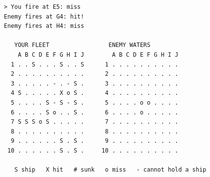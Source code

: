 \begin{lstlisting}[language={}, basicstyle=\ttfamily\footnotesize,
                   caption={Extrait d'une partie dans un terminal
                            (\code{battleship-cli play -{}-seed 7 -{}-level hard}) : l'ordinateur
                            touche en G4, le modèle exclut les diagonales, puis il
                            cherche la suite du bateau.},
                   label={lst-terminal}]
> You fire at E5: miss
Enemy fires at G4: hit!
Enemy fires at H4: miss

   YOUR FLEET                 ENEMY WATERS
    A B C D E F G H I J        A B C D E F G H I J
  1 . . S . . . S . . S      1 . . . . . . . . . .
  2 . . . . . . . . . .      2 . . . . . . . . . .
  3 . . . . . - . - S .      3 . . . . . . . . . .
  4 S . . . . . X o S .      4 . . . . . . . . . .
  5 . . . . S - S - S .      5 . . . . o o . . . .
  6 . . . . S o . . S .      6 . . . . o . . . . .
  7 S S S o S . . . . .      7 . . . . . . . . . .
  8 . . . . . . . . . .      8 . . . . . . . . . .
  9 . . . . . . S . S .      9 . . . . . . . . . .
 10 . . . . . . S . S .     10 . . . . . . . . . .

   S ship   X hit   # sunk   o miss   - cannot hold a ship
\end{lstlisting}
